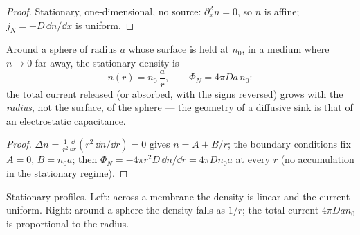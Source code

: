 \begin{proof}
Stationary, one-dimensional, no source: $\partial_x^2 n = 0$, so $n$ is
affine; $j_N = -D\,\dd n/\dd x$ is uniform.
\end{proof}

\begin{proposition}\label{prop:b2:particle-diffusion:sphere}
Around a sphere of radius $a$ whose surface is held at $n_0$, in a
medium where $n \to 0$ far away, the stationary density is
\[
n(r) = n_0\,\frac{a}{r}, \qquad
\Phi_N = 4\pi D a\,n_0 :
\]
the total current released (or absorbed, with the signs reversed) grows
with the \emph{radius}, not the surface, of the sphere --- the
geometry of a diffusive sink is that of an electrostatic capacitance.
\end{proposition}

\begin{proof}
$\Delta n = \frac{1}{r^2}\frac{\dd}{\dd r}(r^2\,\dd n/\dd r) = 0$ gives
$n = A + B/r$; the boundary conditions fix $A = 0$, $B = n_0 a$; then
$\Phi_N = -4\pi r^2 D\,\dd n/\dd r = 4\pi D n_0 a$ at every $r$ (no
accumulation in the stationary regime).
\end{proof}

\begin{omfigure}

{\small Stationary profiles. Left: across a membrane the density is
linear and the current uniform. Right: around a sphere the density
falls as $1/r$; the total current $4\pi D a n_0$ is proportional to the
radius.}
\end{omfigure}

